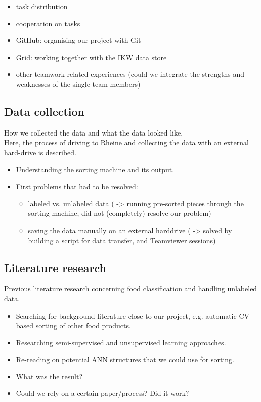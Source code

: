\begin{itemize}
\item task distribution
\item cooperation on tasks
\item GitHub: organising our project with Git
\item Grid: working together with the IKW data store
\item other teamwork related experiences (could we integrate the strengths and weaknesses of the single team members)
\end{itemize}


\subsection{Data collection}

How we collected the data and what the data looked like. \\
Here, the process of driving to Rheine and collecting the data with an external hard-drive is described.

\begin{itemize}
\item Understanding the sorting machine and its output.
\item First problems that had to be resolved:

\begin{itemize}
\item labeled vs. unlabeled data ( -> running pre-sorted pieces through the sorting machine, did not (completely) resolve our problem)
\item saving the data manually on an external harddrive ( -> solved by building a script for data transfer, and Teamviewer sessions)
\end{itemize}

\end{itemize}


\subsection{Literature research}

Previous literature research concerning food classification and handling unlabeled data.

\begin{itemize}
\item Searching for background literature close to our project, e.g. automatic CV-based sorting of other food products.
\item Researching semi-supervised and unsupervised learning approaches.
\item Re-reading on potential ANN structures that we could use for sorting.
\item What was the result?
\item Could we rely on a certain paper/process? Did it work?
\end{itemize}


